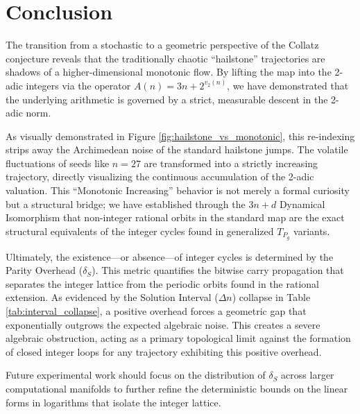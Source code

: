\documentclass[11pt, a4paper]{article}
\theoremstyle{definition}
\begin{document}
\section{Conclusion}

The transition from a stochastic to a geometric perspective of the Collatz conjecture reveals that the traditionally chaotic ``hailstone'' trajectories are shadows of a higher-dimensional monotonic flow. By lifting the map into the 2-adic integers via the operator $A(n) = 3n + 2^{v_2(n)}$, we have demonstrated that the underlying arithmetic is governed by a strict, measurable descent in the 2-adic norm. 

As visually demonstrated in Figure \ref{fig:hailstone_vs_monotonic}, this re-indexing strips away the Archimedean noise of the standard hailstone jumps. The volatile fluctuations of seeds like $n=27$ are transformed into a strictly increasing trajectory, directly visualizing the continuous accumulation of the 2-adic valuation. This ``Monotonic Increasing'' behavior is not merely a formal curiosity but a structural bridge; we have established through the $3n+d$ Dynamical Isomorphism that non-integer rational orbits in the standard map are the exact structural equivalents of the integer cycles found in generalized $T_{P_g}$ variants. 

Ultimately, the existence---or absence---of integer cycles is determined by the Parity Overhead ($\delta_S$). This metric quantifies the bitwise carry propagation that separates the integer lattice from the periodic orbits found in the rational extension. As evidenced by the Solution Interval ($\Delta n$) collapse in Table \ref{tab:interval_collapse}, a positive overhead forces a geometric gap that exponentially outgrows the expected algebraic noise. This creates a severe algebraic obstruction, acting as a primary topological limit against the formation of closed integer loops for any trajectory exhibiting this positive overhead. 

Future experimental work should focus on the distribution of $\delta_S$ across larger computational manifolds to further refine the deterministic bounds on the linear forms in logarithms that isolate the integer lattice.
\end{document}
